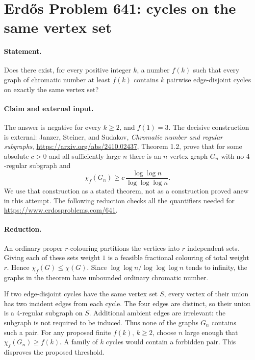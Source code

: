 \section*{Erd\H{o}s Problem 641: cycles on the same vertex set}

\paragraph{Statement.}
Does there exist, for every positive integer \(k\), a number \(f(k)\)
such that every graph of chromatic number at least \(f(k)\) contains
\(k\) pairwise edge-disjoint cycles on exactly the same vertex set?

\paragraph{Claim and external input.}
The answer is negative for every \(k\geq2\), and \(f(1)=3\).
The decisive construction is external: Janzer, Steiner, and Sudakov,
\emph{Chromatic number and regular subgraphs},
\url{https://arxiv.org/abs/2410.02437}, Theorem 1.2, prove that for
some absolute \(c>0\) and all sufficiently large \(n\) there is an
\(n\)-vertex graph \(G_n\) with no \(4\)-regular subgraph and
\[
 \chi_f(G_n)\geq c\,\frac{\log\log n}{\log\log\log n}.
\]
We use that construction as a stated theorem, not as a construction
proved anew in this attempt. The following reduction checks all the
quantifiers needed for \url{https://www.erdosproblems.com/641}.

\paragraph{Reduction.}
An ordinary proper \(r\)-colouring partitions the vertices into \(r\)
independent sets. Giving each of these sets weight \(1\) is a feasible
fractional colouring of total weight \(r\). Hence
\(\chi_f(G)\leq\chi(G)\).
Since \(\log\log n/\log\log\log n\) tends to infinity, the graphs
in the theorem have unbounded ordinary chromatic number.

If two edge-disjoint cycles have the same vertex set \(S\), every
vertex of their union has two incident edges from each cycle.
The four edges are distinct, so their union is a \(4\)-regular
subgraph on \(S\). Additional ambient edges are irrelevant: the
subgraph is not required to be induced. Thus none of the graphs
\(G_n\) contains such a pair.
For any proposed finite \(f(k)\), \(k\geq2\), choose \(n\) large
enough that \(\chi_f(G_n)\geq f(k)\). A family of \(k\) cycles would
contain a forbidden pair. This disproves the proposed threshold.

